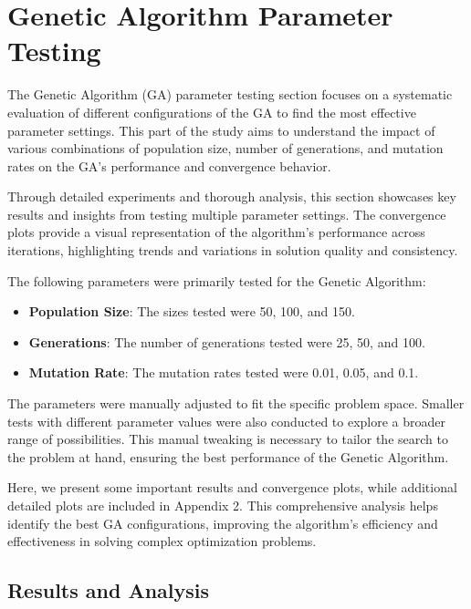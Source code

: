 \documentclass{article}
\begin{document}
    \newpage


    \section{Genetic Algorithm Parameter Testing}
    The Genetic Algorithm (GA) parameter testing section focuses on a systematic evaluation of different configurations of the GA to find the most effective parameter settings. This part of the study aims to understand the impact of various combinations of population size, number of generations, and mutation rates on the GA's performance and convergence behavior.

    Through detailed experiments and thorough analysis, this section showcases key results and insights from testing multiple parameter settings. The convergence plots provide a visual representation of the algorithm's performance across iterations, highlighting trends and variations in solution quality and consistency.

    The following parameters were primarily tested for the Genetic Algorithm:

    \begin{itemize}
        \item \textbf{Population Size}: The sizes tested were 50, 100, and 150.
        \item \textbf{Generations}: The number of generations tested were 25, 50, and 100.
        \item \textbf{Mutation Rate}: The mutation rates tested were 0.01, 0.05, and 0.1.
    \end{itemize}

    The parameters were manually adjusted to fit the specific problem space.
    Smaller tests with different parameter values were also conducted to explore a broader range of possibilities. This manual tweaking is necessary to tailor the search to the problem at hand, ensuring the best performance of the Genetic Algorithm.


    Here, we present some important results and convergence plots, while additional detailed plots are included in Appendix 2. This comprehensive analysis helps identify the best GA configurations, improving the algorithm's efficiency and effectiveness in solving complex optimization problems.

    \subsection{Results and Analysis}
\end{document}
